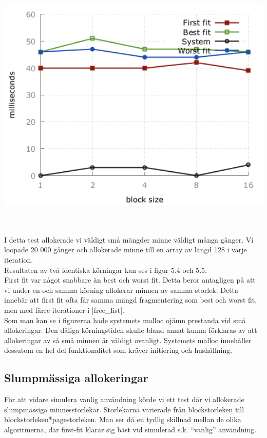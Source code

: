 \documentclass[paper=a4, fontsize=11pt]{scrartcl} %
\numberwithin{equation}{section} %
\numberwithin{figure}{section} %
\numberwithin{table}{section} %
\begin{document}
\begin{minipage}{.5\textwidth}
    \centering
    \includegraphics[width=1\textwidth]{images/time_plot_small2.png}
    \label{fig:small2}
\end{minipage}\\\\

I detta test allokerade vi väldigt små mängder minne väldigt många gånger.
Vi loopade 20 000 gånger och allokerade minne till en
array av längd 128 i varje iteration.\\
Resultaten av två identiska körningar kan ses i figur 5.4 och 5.5.\\

First fit var något snabbare än best och worst fit. Detta beror antagligen på
att vi under en och samma körning allokerar minnen av samma storlek. Detta 
innebär att first fit ofta får samma mängd fragmentering som best och worst fit,
men med färre iterationer i |free_list|.\\

Som man kan se i figurerna hade systemets malloc ojämn prestanda vid små allokeringar.
Den dåliga körningstiden skulle bland annat kunna förklaras av att allokeringar
av så små minnen är väldigt ovanligt.
Systemets malloc innehåller dessutom en hel del funktionalitet som kräver
initiering och hushållning.\\


\subsection{Slumpmässiga allokeringar}
För att vidare simulera vanlig användning körde vi ett test där vi allokerade
slumpmässiga minnesstorlekar.
Storlekarna varierade från blockstorleken till blockstorleken*pagestorleken.
Man ser då en tydlig skillnad mellan de olika algoritmerna, där first-fit
klarar sig bäst vid simulerad s.k. ``vanlig'' användning.\\
\end{document}
